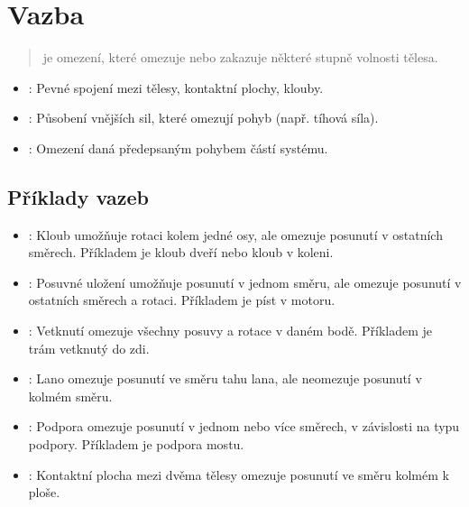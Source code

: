 \documentclass[letterpaper,10pt,english]{jupyterBook}
\begin{document}
\section{Vazba}
\label{\detokenize{Prednasky/1_1_Stupe_u0148_volnosti:vazba}}\begin{quote}

\sphinxAtStartPar
{} je omezení, které omezuje nebo zakazuje některé stupně volnosti tělesa.
\end{quote}
\begin{itemize}
\item {} 
\sphinxAtStartPar
{}: Pevné spojení mezi tělesy, kontaktní plochy, klouby.

\item {} 
\sphinxAtStartPar
{}: Působení vnějších sil, které omezují pohyb (např. tíhová síla).

\item {} 
\sphinxAtStartPar
{}: Omezení daná předepsaným pohybem částí systému.

\end{itemize}


\subsection{Příklady vazeb}
\label{\detokenize{Prednasky/1_1_Stupe_u0148_volnosti:priklady-vazeb}}\begin{itemize}
\item {} 
\sphinxAtStartPar
{}: Kloub umožňuje rotaci kolem jedné osy, ale omezuje posunutí v ostatních směrech. Příkladem je kloub dveří nebo kloub v koleni.

\item {} 
\sphinxAtStartPar
{}: Posuvné uložení umožňuje posunutí v jednom směru, ale omezuje posunutí v ostatních směrech a rotaci. Příkladem je píst v motoru.

\item {} 
\sphinxAtStartPar
{}: Vetknutí omezuje všechny posuvy a rotace v daném bodě. Příkladem je trám vetknutý do zdi.

\item {} 
\sphinxAtStartPar
{}: Lano omezuje posunutí ve směru tahu lana, ale neomezuje posunutí v kolmém směru.

\item {} 
\sphinxAtStartPar
{}: Podpora omezuje posunutí v jednom nebo více směrech, v závislosti na typu podpory. Příkladem je podpora mostu.

\item {} 
\sphinxAtStartPar
{}: Kontaktní plocha mezi dvěma tělesy omezuje posunutí ve směru kolmém k ploše.

\end{itemize}
\end{document}
